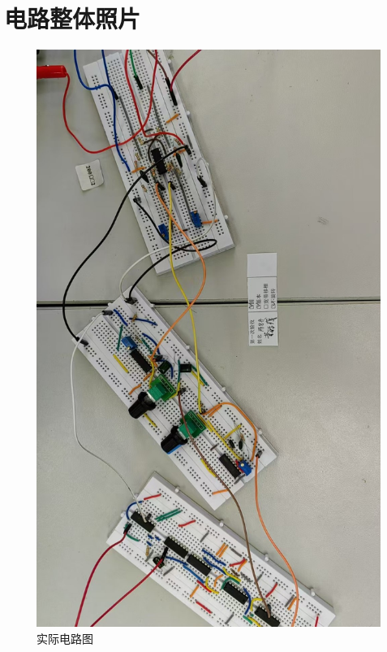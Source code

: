 \section{电路整体照片}
\begin{figure}[H]
    \centering
    \includegraphics[width=0.7\linewidth]{images/circuit-real.jpg}
    \caption{实际电路图}
\end{figure}